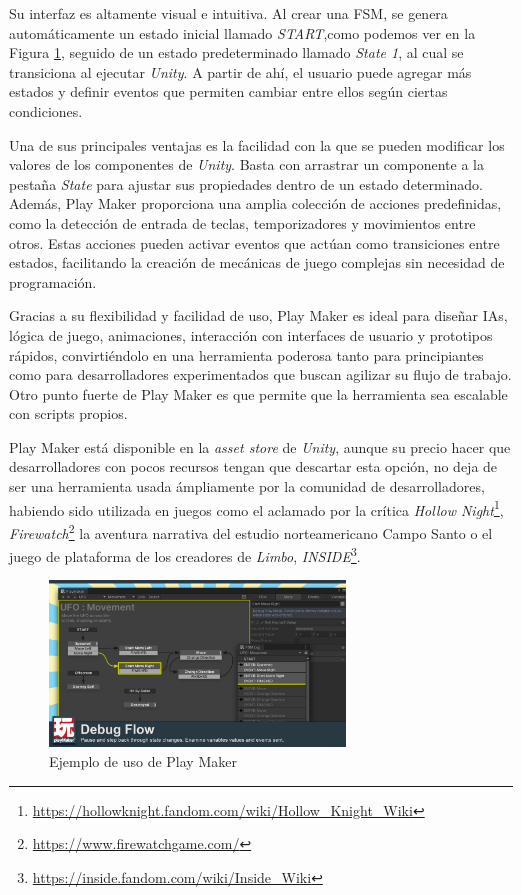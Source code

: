 Su interfaz es altamente visual e intuitiva. Al crear una FSM, se genera automáticamente un estado inicial llamado \textit{START},como podemos ver en la Figura \ref{fig:PlayMaker_Figure}, seguido de un estado predeterminado llamado \textit{State 1}, al cual se transiciona al ejecutar \textit{Unity}. A partir de ahí, el usuario puede agregar más estados y definir eventos que permiten cambiar entre ellos según ciertas condiciones.

Una de sus principales ventajas es la facilidad con la que se pueden modificar los valores de los componentes de \textit{Unity}. Basta con arrastrar un componente a la pestaña \textit{State} para ajustar sus propiedades dentro de un estado determinado. Además, Play Maker proporciona una amplia colección de acciones predefinidas, como la detección de entrada de teclas, temporizadores y movimientos entre otros. Estas acciones pueden activar eventos que actúan como transiciones entre estados, facilitando la creación de mecánicas de juego complejas sin necesidad de programación.

Gracias a su flexibilidad y facilidad de uso, Play Maker es ideal para diseñar IAs, lógica de juego, animaciones, interacción con interfaces de usuario y prototipos rápidos, convirtiéndolo en una herramienta poderosa tanto para principiantes como para desarrolladores experimentados que buscan agilizar su flujo de trabajo. Otro punto fuerte de Play Maker es que permite que la herramienta sea escalable con scripts propios.

Play Maker está disponible en la \textit{asset store} de \textit{Unity}, aunque su precio hacer que desarrolladores con pocos recursos tengan que descartar esta opción, no deja de ser una herramienta usada ámpliamente por la comunidad de desarrolladores, habiendo sido utilizada en juegos como el aclamado por la crítica \textit{Hollow Night}\footnote{\url{https://hollowknight.fandom.com/wiki/Hollow_Knight_Wiki}}, \textit{Firewatch}\footnote{\url{https://www.firewatchgame.com/}} la aventura narrativa del estudio norteamericano Campo Santo o el juego de plataforma de los creadores de \textit{Limbo}, \textit{INSIDE}\footnote{\url{https://inside.fandom.com/wiki/Inside_Wiki}}.\\

\begin{figure}[h]
	\centering
	\includegraphics[width = 0.7\textwidth]{Imagenes/PlayMaker.jpg}
	\caption{Ejemplo de uso de Play Maker}
	\label{fig:PlayMaker_Figure}
\end{figure}

